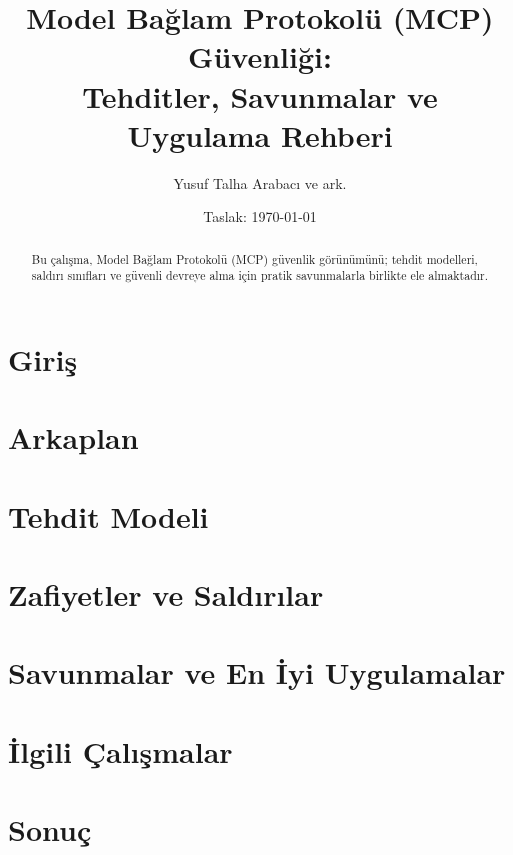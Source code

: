 \documentclass[11pt,a4paper]{article}
\title{Model Bağlam Protokolü (MCP) Güvenliği:\\ Tehditler, Savunmalar ve Uygulama Rehberi}
\author{Yusuf Talha Arabacı ve ark.}
\date{Taslak: \today}
\begin{document}
\maketitle
\begin{abstract}
Bu çalışma, Model Bağlam Protokolü (MCP) güvenlik görünümünü; tehdit modelleri, saldırı sınıfları ve güvenli devreye alma için pratik savunmalarla birlikte ele almaktadır.
\end{abstract}

\section{Giriş}

\section{Arkaplan}

\section{Tehdit Modeli}

\section{Zafiyetler ve Saldırılar}

\section{Savunmalar ve En İyi Uygulamalar}

\section{İlgili Çalışmalar}

\section{Sonuç}


\printbibliography
\end{document}

